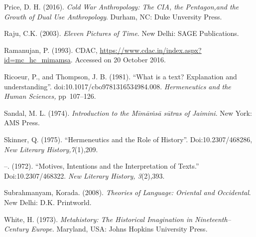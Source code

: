 \begin{thebibliography}{99}
  Price, D. H. (2016). \textit{Cold War Anthropology: The CIA, the Pentagon,and the Growth of Dual Use Anthropology}. Durham, NC: Duke Unversity Press.

  Raju, C.K. (2003). \textit{Eleven Pictures of Time}. New Delhi: SAGE Publications.

  Ramanujan, P. (1993). CDAC, \url{https://www.cdac.in/index.aspx?id=mc_hc_mimamsa}. Accessed on 20 October 2016.

  Ricoeur, P., and Thompson, J. B. (1981). “What is a text? Explanation and understanding”. doi:10.1017/cbo9781316534984.008. \textit{Hermeneutics and the Human Sciences,} pp~107–126.

  Sandal, M. L. (1974). \textit{Introduction to the Mīmāṁsā sūtras of Jaimini}. New York: AMS Press.

  Skinner, Q. (1975). “Hermeneutics and the Role of History”. Doi:10.2307/468286, \textit{New Literary History,7}(1),209.

  –. (1972). “Motives, Intentions and the Interpretation of Texts.” Doi:10.2307/468322. \textit{New Literary History, 3}(2),393.

  Subrahmanyam, Korada. (2008). \textit{Theories of Language: Oriental and Occidental}. New Delhi: D.K. Printworld.

  White, H. (1973). \textit{Metahistory: The Historical Imagination in Nineteenth–Century Europe.} Maryland, USA: Johns Hopkins University Press.

 \end{thebibliography}

\theendnotes


